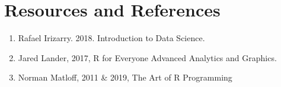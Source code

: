 \documentclass[
]{article}
\providecommand{\tightlist}{%
  \setlength{\itemsep}{0pt}\setlength{\parskip}{0pt}}
\begin{document}
\newpage

\hypertarget{resources-and-references}{%
\section{Resources and References}\label{resources-and-references}}

\begin{enumerate}
\def\labelenumi{\arabic{enumi}.}
\tightlist
\item
  Rafael Irizarry. 2018. Introduction to Data Science.
\item
  Jared Lander, 2017, R for Everyone Advanced Analytics and Graphics.
\item
  Norman Matloff, 2011 \& 2019, The Art of R Programming
\end{enumerate}
\end{document}
